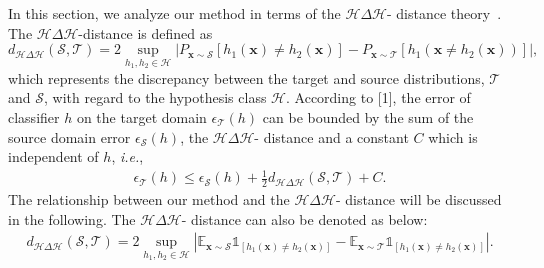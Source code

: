 \documentclass{article}
\newcommand*\ie{\textit{i.e.}}
\begin{document}
In this section, we analyze our method in terms of the $\mathcal{H}\Delta\mathcal{H}$- distance theory~\cite{proof_conver1}. The $\mathcal{H}\Delta\mathcal{H}$-distance is defined as 
\begin{equation}
   d_{\mathcal{H}\Delta\mathcal{H}}(\mathcal{S},\mathcal{T})=
   2\sup_{h_1,h_2\in\mathcal{H}}\left|P_{\mathbf{x}\sim \mathcal{S}}\left[h_1(\mathbf{x})\neq h_2(\mathbf{x})\right]-P_{\mathbf{x}\sim \mathcal{T}}\left[h_1(\mathbf{x}\neq h_2(\mathbf{x}))\right]\right|,
\end{equation}
which represents the discrepancy between the target and source distributions, $\mathcal{T}$ and $\mathcal{S}$, with regard to the hypothesis class $\mathcal{H}$. According to [1], the error of classifier $h$ on the target domain $\epsilon_{\mathcal{T}}(h)$ can be bounded by the sum of the source domain error $\epsilon_{\mathcal{S}}(h)$, the $\mathcal{H}\Delta\mathcal{H}$- distance and a constant $C$ which is independent of $h$, \ie,
\begin{align}
 \epsilon_{\mathcal{T}}(h)\leq \epsilon_{\mathcal{S}}(h) +\frac{1}{2} d_{\mathcal{H}\Delta\mathcal{H}}(\mathcal{S},\mathcal{T})+C.
\end{align}
The relationship between our method and the $\mathcal{H}\Delta\mathcal{H}$- distance will be discussed in the following. The $\mathcal{H}\Delta\mathcal{H}$- distance can also be denoted as below:
\begin{align}
d_{\mathcal{H}\Delta\mathcal{H}}(\mathcal{S},\mathcal{T})=2\sup_{h_1,h_2\in\mathcal{H}}\left|\mathbb{E}_{\mathbf{x}\sim\mathcal{S}}\mathds{1}_{\left[h_1(\mathbf{x})\neq h_2(\mathbf{x})\right]}-\mathbb{E}_{\mathbf{x}\sim\mathcal{T}}\mathds{1}_{\left[h_1(\mathbf{x})\neq h_2(\mathbf{x})\right]}\right|.   
\end{align}
\end{document}
